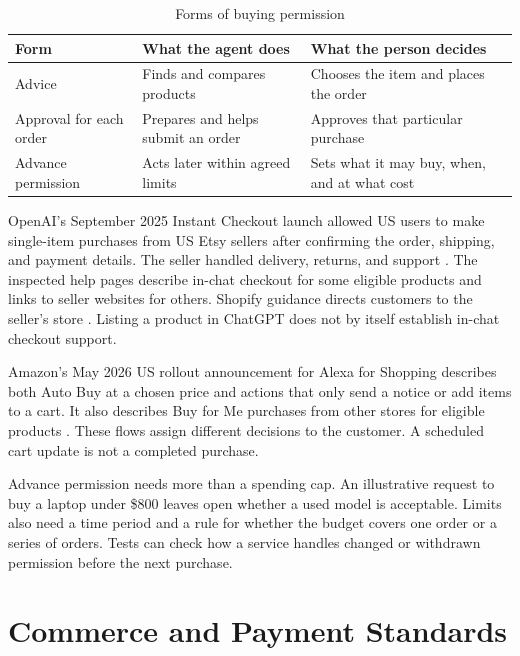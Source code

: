 \documentclass{article}
\begin{document}
\begin{table}[H]
\centering
\caption{Forms of buying permission}
\footnotesize
\begin{tabularx}{\textwidth}{@{}>{\raggedright\arraybackslash}X>{\raggedright\arraybackslash}X>{\raggedright\arraybackslash}X@{}}
\toprule
\textbf{Form} & \textbf{What the agent does} & \textbf{What the person decides} \\
\midrule
Advice & Finds and compares products & Chooses the item and places the order \\[3pt]
Approval for each order & Prepares and helps submit an order & Approves that particular purchase \\[3pt]
Advance permission & Acts later within agreed limits & Sets what it may buy, when, and at what cost \\[3pt]
\bottomrule
\end{tabularx}
\end{table}

OpenAI's September 2025 Instant Checkout launch allowed US users to make single-item purchases from US Etsy sellers after confirming the order, shipping, and payment details. The seller handled delivery, returns, and support \cite{ref1}. The inspected help pages describe in-chat checkout for some eligible products and links to seller websites for others. Shopify guidance directs customers to the seller's store \cite{ref2,ref3}. Listing a product in ChatGPT does not by itself establish in-chat checkout support.

Amazon's May 2026 US rollout announcement for Alexa for Shopping describes both Auto Buy at a chosen price and actions that only send a notice or add items to a cart. It also describes Buy for Me purchases from other stores for eligible products \cite{ref4}. These flows assign different decisions to the customer. A scheduled cart update is not a completed purchase.

Advance permission needs more than a spending cap. An illustrative request to buy a laptop under \$800 leaves open whether a used model is acceptable. Limits also need a time period and a rule for whether the budget covers one order or a series of orders. Tests can check how a service handles changed or withdrawn permission before the next purchase.

\section{Commerce and Payment Standards}
\end{document}
